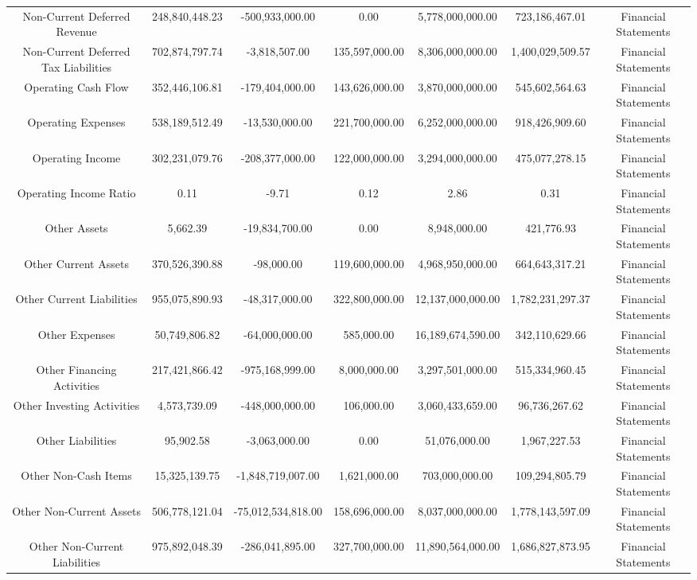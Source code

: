 \begin{longtable}{ccccccc}
Non-Current Deferred Revenue & 248,840,448.23 & -500,933,000.00 & 0.00 & 5,778,000,000.00 & 723,186,467.01 & Financial Statements \\
Non-Current Deferred Tax Liabilities & 702,874,797.74 & -3,818,507.00 & 135,597,000.00 & 8,306,000,000.00 & 1,400,029,509.57 & Financial Statements \\
Operating Cash Flow & 352,446,106.81 & -179,404,000.00 & 143,626,000.00 & 3,870,000,000.00 & 545,602,564.63 & Financial Statements \\
Operating Expenses & 538,189,512.49 & -13,530,000.00 & 221,700,000.00 & 6,252,000,000.00 & 918,426,909.60 & Financial Statements \\
Operating Income & 302,231,079.76 & -208,377,000.00 & 122,000,000.00 & 3,294,000,000.00 & 475,077,278.15 & Financial Statements \\
Operating Income Ratio & 0.11 & -9.71 & 0.12 & 2.86 & 0.31 & Financial Statements \\
Other Assets & 5,662.39 & -19,834,700.00 & 0.00 & 8,948,000.00 & 421,776.93 & Financial Statements \\
Other Current Assets & 370,526,390.88 & -98,000.00 & 119,600,000.00 & 4,968,950,000.00 & 664,643,317.21 & Financial Statements \\
Other Current Liabilities & 955,075,890.93 & -48,317,000.00 & 322,800,000.00 & 12,137,000,000.00 & 1,782,231,297.37 & Financial Statements \\
Other Expenses & 50,749,806.82 & -64,000,000.00 & 585,000.00 & 16,189,674,590.00 & 342,110,629.66 & Financial Statements \\
Other Financing Activities & 217,421,866.42 & -975,168,999.00 & 8,000,000.00 & 3,297,501,000.00 & 515,334,960.45 & Financial Statements \\
Other Investing Activities & 4,573,739.09 & -448,000,000.00 & 106,000.00 & 3,060,433,659.00 & 96,736,267.62 & Financial Statements \\
Other Liabilities & 95,902.58 & -3,063,000.00 & 0.00 & 51,076,000.00 & 1,967,227.53 & Financial Statements \\
Other Non-Cash Items & 15,325,139.75 & -1,848,719,007.00 & 1,621,000.00 & 703,000,000.00 & 109,294,805.79 & Financial Statements \\
Other Non-Current Assets & 506,778,121.04 & -75,012,534,818.00 & 158,696,000.00 & 8,037,000,000.00 & 1,778,143,597.09 & Financial Statements \\
Other Non-Current Liabilities & 975,892,048.39 & -286,041,895.00 & 327,700,000.00 & 11,890,564,000.00 & 1,686,827,873.95 & Financial Statements \\

\end{longtable}
